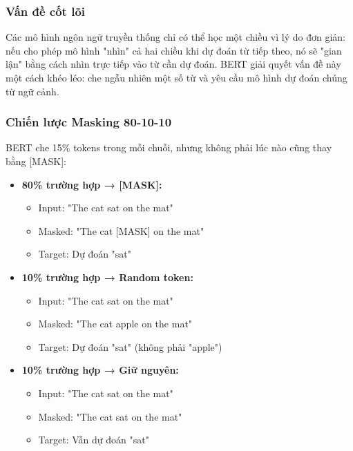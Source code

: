 \subsubsection{Vấn đề cốt lõi}
Các mô hình ngôn ngữ truyền thống chỉ có thể học một chiều vì lý do đơn giản: nếu cho phép mô hình "nhìn" cả hai chiều khi dự đoán từ tiếp theo, nó sẽ "gian lận" bằng cách nhìn trực tiếp vào từ cần dự đoán. BERT giải quyết vấn đề này một cách khéo léo: che ngẫu nhiên một số từ và yêu cầu mô hình dự đoán chúng từ ngữ cảnh.

\subsubsection{Chiến lược Masking 80-10-10}
BERT che 15\% tokens trong mỗi chuỗi, nhưng không phải lúc nào cũng thay bằng [MASK]:

\begin{itemize}
    \item \textbf{80\% trường hợp → [MASK]:} 
    \begin{itemize}
        \item Input: "The cat sat on the mat"
        \item Masked: "The cat [MASK] on the mat"
        \item Target: Dự đoán "sat"
    \end{itemize}
    
    \item \textbf{10\% trường hợp → Random token:}
    \begin{itemize}
        \item Input: "The cat sat on the mat"
        \item Masked: "The cat apple on the mat"
        \item Target: Dự đoán "sat" (không phải "apple")
    \end{itemize}
    
    \item \textbf{10\% trường hợp → Giữ nguyên:}
    \begin{itemize}
        \item Input: "The cat sat on the mat"
        \item Masked: "The cat sat on the mat"
        \item Target: Vẫn dự đoán "sat"
    \end{itemize}
\end{itemize}

